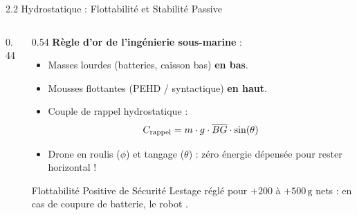 \begin{frame}{2.2 Hydrostatique : Flottabilité et Stabilité Passive}
  \begin{columns}[c]
    \begin{column}{0.44\textwidth}
      \begin{center}
      \end{center}
    \end{column}

    \begin{column}{0.54\textwidth}
      \small
      \textbf{Règle d'or de l'ingénierie sous-marine} :
      \begin{itemize}\setlength{\itemsep}{2pt}\setlength{\parskip}{0pt}
        \item Masses lourdes (batteries, caisson bas) \textbf{en bas}.
        \item Mousses flottantes (PEHD / syntactique) \textbf{en haut}.
        \item Couple de rappel hydrostatique :
        \begin{equation*}
          \setlength{\abovedisplayskip}{2pt}
          \setlength{\belowdisplayskip}{2pt}
          C_{\text{rappel}} = m \cdot g \cdot \overline{BG} \cdot \sin(\theta)
        \end{equation*}
        \item Drone  en roulis ($\phi$) et tangage ($\theta$) : zéro énergie dépensée pour rester horizontal !
      \end{itemize}

      \vspace{0.2em}
      \begin{block}{Flottabilité Positive de Sécurité}
        Lestage réglé pour $+200$ à $+500\,\text{g}$ nets : en cas de coupure de batterie, le robot .
      \end{block}
    \end{column}
  \end{columns}
\end{frame}

